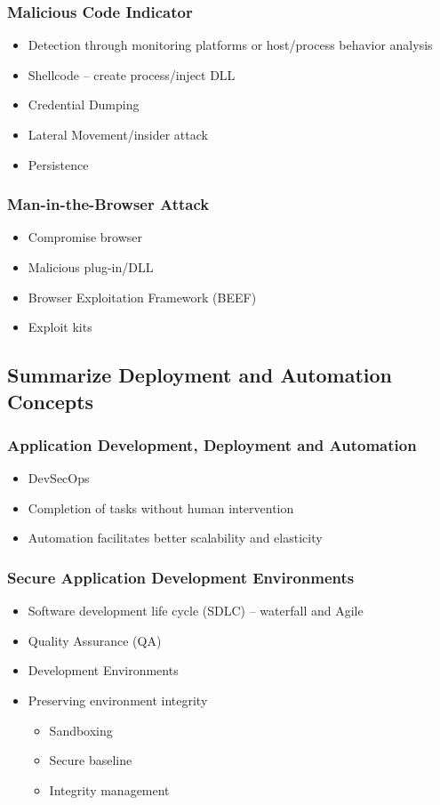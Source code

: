 		\subsubsection {Malicious Code Indicator}
			\begin{itemize}
				\item Detection through monitoring platforms or host/process behavior
					analysis
				\item Shellcode -- create process/inject DLL
				\item Credential Dumping
				\item Lateral Movement/insider attack
				\item Persistence
			\end{itemize}
		\subsubsection {Man-in-the-Browser Attack}
			\begin{itemize}
				\item Compromise browser
				\item Malicious plug-in/DLL
				\item Browser Exploitation Framework (BEEF)
				\item Exploit kits
			\end{itemize}
	\subsection {Summarize Deployment and Automation Concepts}
		\subsubsection {Application Development, Deployment and Automation}
			\begin{itemize}
				\item DevSecOps
				\item Completion of tasks without human intervention
				\item Automation facilitates better scalability and elasticity
			\end{itemize}
		\subsubsection {Secure Application Development Environments}
			\begin{itemize}
				\item Software development life cycle (SDLC) -- waterfall and Agile
				\item Quality Assurance (QA)
				\item Development Environments
				\item Preserving environment integrity
					\begin{itemize}
						\item Sandboxing
						\item Secure baseline
						\item Integrity management
					\end{itemize}
			\end{itemize}
